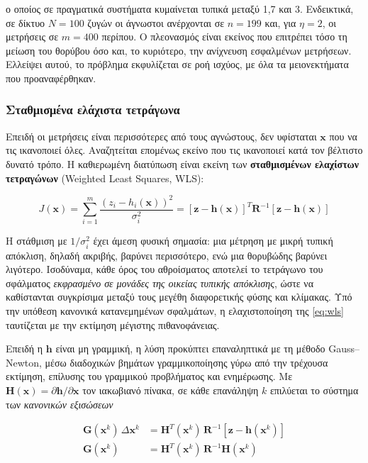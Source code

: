 ο οποίος σε πραγματικά συστήματα κυμαίνεται τυπικά μεταξύ 1,7 και 3. Ενδεικτικά, σε δίκτυο
$N = 100$ ζυγών οι άγνωστοι ανέρχονται σε $n = 199$ και, για $\eta = 2$, οι μετρήσεις σε
$m = 400$ περίπου. Ο πλεονασμός είναι εκείνος που επιτρέπει τόσο τη μείωση του θορύβου όσο
και, το κυριότερο, την ανίχνευση εσφαλμένων μετρήσεων. Ελλείψει αυτού, το πρόβλημα
εκφυλίζεται σε ροή ισχύος, με όλα τα μειονεκτήματα που προαναφέρθηκαν.

\subsubsection*{Σταθμισμένα ελάχιστα τετράγωνα}

Επειδή οι μετρήσεις είναι περισσότερες από τους αγνώστους, δεν υφίσταται $\mathbf{x}$ που
να τις ικανοποιεί όλες. Αναζητείται επομένως εκείνο που τις ικανοποιεί κατά τον βέλτιστο
δυνατό τρόπο. Η καθιερωμένη διατύπωση είναι εκείνη των \textbf{σταθμισμένων ελαχίστων
τετραγώνων} (Weighted Least Squares, WLS):

\begin{equation}
J(\mathbf{x}) = \sum_{i=1}^{m} \frac{\left(z_i - h_i(\mathbf{x})\right)^2}{\sigma_i^2}
             = \left[\mathbf{z}-\mathbf{h}(\mathbf{x})\right]^{T} \mathbf{R}^{-1}
               \left[\mathbf{z}-\mathbf{h}(\mathbf{x})\right]
\label{eq:wls}
\end{equation}

Η στάθμιση με $1/\sigma_i^2$ έχει άμεση φυσική σημασία: μια μέτρηση με μικρή τυπική
απόκλιση, δηλαδή ακριβής, βαρύνει περισσότερο, ενώ μια θορυβώδης βαρύνει λιγότερο.
Ισοδύναμα, κάθε όρος του αθροίσματος αποτελεί το τετράγωνο του σφάλματος \emph{εκφρασμένο
σε μονάδες της οικείας τυπικής απόκλισης}, ώστε να καθίστανται συγκρίσιμα μεταξύ τους
μεγέθη διαφορετικής φύσης και κλίμακας. Υπό την υπόθεση κανονικά κατανεμημένων σφαλμάτων,
η ελαχιστοποίηση της \eqref{eq:wls} ταυτίζεται με την εκτίμηση μέγιστης πιθανοφάνειας.

Επειδή η $\mathbf{h}$ είναι μη γραμμική, η λύση προκύπτει επαναληπτικά με τη μέθοδο
Gauss--Newton, μέσω διαδοχικών βημάτων γραμμικοποίησης γύρω από την τρέχουσα εκτίμηση,
επίλυσης του γραμμικού προβλήματος και ενημέρωσης. Με
$\mathbf{H}(\mathbf{x}) = \partial \mathbf{h}/\partial \mathbf{x}$ τον ιακωβιανό πίνακα, σε
κάθε επανάληψη $k$ επιλύεται το σύστημα των \emph{κανονικών εξισώσεων}

\begin{align}
\mathbf{G}(\mathbf{x}^{k}) \, \Delta \mathbf{x}^{k}
  &= \mathbf{H}^{T}(\mathbf{x}^{k}) \, \mathbf{R}^{-1}
     \left[\mathbf{z} - \mathbf{h}(\mathbf{x}^{k})\right] \\
\mathbf{G}(\mathbf{x}^{k})
  &= \mathbf{H}^{T}(\mathbf{x}^{k}) \, \mathbf{R}^{-1} \mathbf{H}(\mathbf{x}^{k})
\label{eq:gain}
\end{align}

